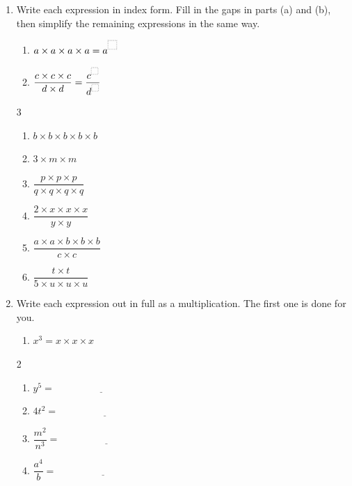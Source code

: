 \documentclass[12pt,a4paper]{article}
\newcommand{\ansline}[1][2.2cm]{\underline{\hspace{#1}}}
\newcommand{\boxgap}[1][9pt]{\tikz[baseline=-0.8pt]\draw[gray!60,densely dotted,thick]
  (0,0) rectangle (#1,#1);}
\begin{document}
\begin{enumerate}[resume]

\item Write each expression in index form. Fill in the gaps in parts (a) and
(b), then simplify the remaining expressions in the same way.
\begin{enumerate}
  \item $a\times a\times a\times a=a^{\boxgap}$
  \item $\dfrac{c\times c\times c}{d\times d}=\dfrac{c^{\boxgap[7pt]}}{d^{\boxgap[7pt]}}$
\end{enumerate}
\vspace{4pt}
\begin{multicols}{3}
\begin{enumerate}[resume]
  \item $b\times b\times b\times b\times b$
  \item $3\times m\times m$
  \item $\dfrac{p\times p\times p}{q\times q\times q\times q}$
  \item $\dfrac{2\times x\times x\times x}{y\times y}$
  \item $\dfrac{a\times a\times b\times b\times b}{c\times c}$
  \item $\dfrac{t\times t}{5\times u\times u\times u}$
\end{enumerate}
\end{multicols}
\vspace{8em}

\item Write each expression out in full as a multiplication. The first one is
done for you.
\begin{enumerate}
  \item $x^3=x\times x\times x$
\end{enumerate}
\vspace{2pt}
\begin{multicols}{2}
\begin{enumerate}[resume]
  \item $y^5=\ansline[4cm]$
  \item $4t^2=\ansline[4cm]$
  \item $\dfrac{m^2}{n^3}=\ansline[4cm]$
  \item $\dfrac{a^4}{b}=\ansline[4cm]$
\end{enumerate}
\end{multicols}

\end{enumerate}

\vspace{6pt}
\end{document}
